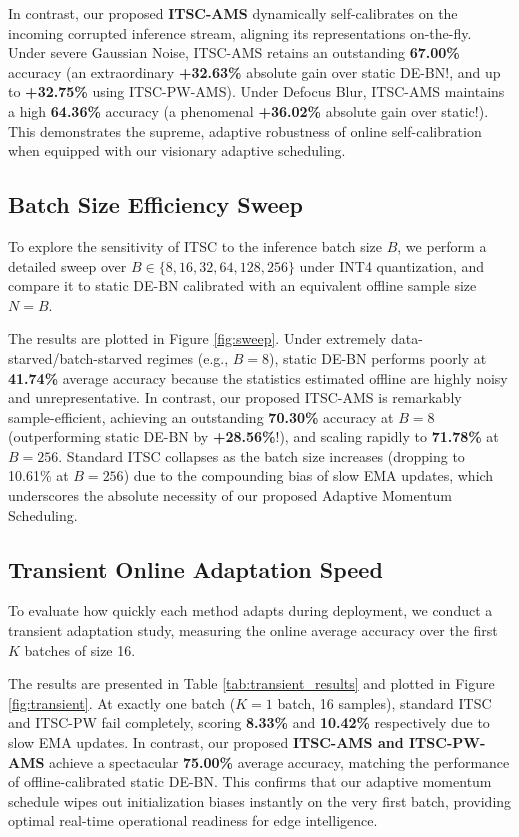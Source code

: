 \documentclass{article}
\theoremstyle{plain}
\theoremstyle{definition}
\theoremstyle{remark}
\begin{document}
In contrast, our proposed \textbf{ITSC-AMS} dynamically self-calibrates on the incoming corrupted inference stream, aligning its representations on-the-fly. Under severe Gaussian Noise, ITSC-AMS retains an outstanding \textbf{67.00\%} accuracy (an extraordinary \textbf{+32.63\%} absolute gain over static DE-BN!, and up to \textbf{+32.75\%} using ITSC-PW-AMS). Under Defocus Blur, ITSC-AMS maintains a high \textbf{64.36\%} accuracy (a phenomenal \textbf{+36.02\%} absolute gain over static!). This demonstrates the supreme, adaptive robustness of online self-calibration when equipped with our visionary adaptive scheduling.

\subsection{Batch Size Efficiency Sweep}
To explore the sensitivity of ITSC to the inference batch size $B$, we perform a detailed sweep over $B \in \{8, 16, 32, 64, 128, 256\}$ under INT4 quantization, and compare it to static DE-BN calibrated with an equivalent offline sample size $N = B$.

The results are plotted in Figure \ref{fig:sweep}. Under extremely data-starved/batch-starved regimes (e.g., $B=8$), static DE-BN performs poorly at \textbf{41.74\%} average accuracy because the statistics estimated offline are highly noisy and unrepresentative. In contrast, our proposed ITSC-AMS is remarkably sample-efficient, achieving an outstanding \textbf{70.30\%} accuracy at $B=8$ (outperforming static DE-BN by \textbf{+28.56\%}!), and scaling rapidly to \textbf{71.78\%} at $B=256$. Standard ITSC collapses as the batch size increases (dropping to 10.61\% at $B=256$) due to the compounding bias of slow EMA updates, which underscores the absolute necessity of our proposed Adaptive Momentum Scheduling.

\subsection{Transient Online Adaptation Speed}
To evaluate how quickly each method adapts during deployment, we conduct a transient adaptation study, measuring the online average accuracy over the first $K$ batches of size 16.

The results are presented in Table \ref{tab:transient_results} and plotted in Figure \ref{fig:transient}. At exactly one batch ($K=1$ batch, 16 samples), standard ITSC and ITSC-PW fail completely, scoring \textbf{8.33\%} and \textbf{10.42\%} respectively due to slow EMA updates. In contrast, our proposed \textbf{ITSC-AMS and ITSC-PW-AMS} achieve a spectacular \textbf{75.00\%} average accuracy, matching the performance of offline-calibrated static DE-BN. This confirms that our adaptive momentum schedule wipes out initialization biases instantly on the very first batch, providing optimal real-time operational readiness for edge intelligence.
\end{document}
